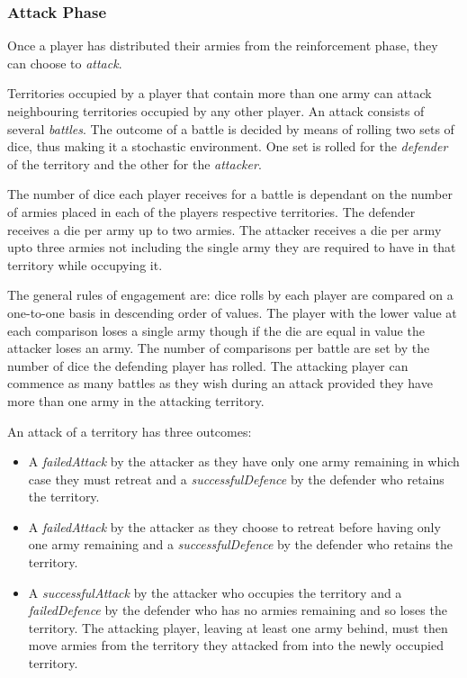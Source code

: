\documentclass[parskip]{cs4rep}
\begin{document}
\subsubsection{Attack Phase}

Once a player has distributed their armies from the reinforcement phase, they can choose to \textit{attack}. 

Territories occupied by a player that contain more than one army can attack neighbouring territories occupied by any other player. An attack consists of several \textit{battles}. The outcome of a battle is decided by means of rolling two sets of dice, thus making it a stochastic environment. One set is rolled for the \textit{defender} of the territory and the other for the \textit{attacker}. 

The number of dice each player receives for a battle is dependant on the number of armies placed in each of the players respective territories. The defender receives a die per army up to two armies. The attacker receives a die per army upto three armies not including the single army they are required to have in that territory while occupying it. 

The general rules of engagement are: dice rolls by each player are compared on a one-to-one basis in descending order of values. The player with the lower value at each comparison loses a single army though if the die are equal in value the attacker loses an army. The number of comparisons per battle are set by the number of dice the defending player has rolled. The attacking player can commence as many battles as they wish during an attack provided they have more than one army in the attacking territory.

An attack of a territory has three outcomes:

\begin{itemize}
\item
A \textit{failedAttack} by the attacker as they have only one army remaining in which case they must retreat and a \textit{successfulDefence} by the defender who retains the territory.
\item
A \textit{failedAttack} by the attacker as they choose to retreat before having only one army remaining and a \textit{successfulDefence} by the defender who retains the territory.
\item
A \textit{successfulAttack} by the attacker who occupies the territory and a \textit{failedDefence} by the defender who has no armies remaining and so loses the territory. The attacking player, leaving at least one army behind, must then move armies from the territory they attacked from into the newly occupied territory.
\end{itemize}
\end{document}
